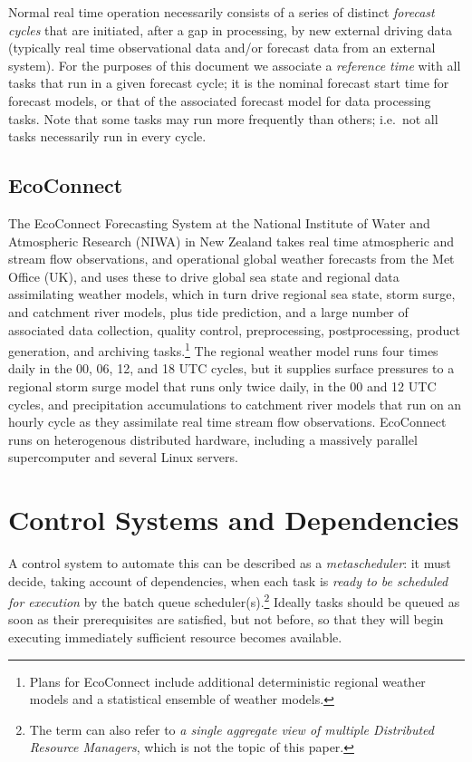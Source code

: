 \documentclass[11pt,a4paper]{article}
\begin{document}
Normal real time operation necessarily consists of a series of distinct
{\em forecast cycles} that are initiated, after a gap in processing, by
new external driving data (typically real time observational data and/or
forecast data from an external system). For the purposes of this
document we associate a {\em reference time} with all tasks that run in
a given forecast cycle; it is the nominal forecast start time for
forecast models, or that of the associated forecast model for data
processing tasks. Note that some tasks may run more frequently than
others; i.e.\ not all tasks necessarily run in every cycle. 


\subsection{EcoConnect}

The EcoConnect Forecasting System at the National Institute of Water and
Atmospheric Research (NIWA) in New Zealand takes real time atmospheric
and stream flow observations, and operational global weather forecasts
from the Met Office (UK), and uses these to drive global sea state and
regional data assimilating weather models, which in turn drive regional
sea state, storm surge, and catchment river models, plus tide
prediction, and a large number of associated data collection, quality
control, preprocessing, postprocessing, product generation, and
archiving tasks.\footnote{Plans for EcoConnect include additional
deterministic regional weather models and a statistical ensemble of
weather models.}  The regional weather model runs four times daily in
the 00, 06, 12, and 18 UTC cycles, but it supplies surface pressures to
a regional storm surge model that runs only twice daily, in the 00 and
12 UTC cycles, and precipitation accumulations to catchment river models
that run on an hourly cycle as they assimilate real time stream flow
observations. EcoConnect runs on heterogenous distributed hardware,
including a massively parallel supercomputer and several Linux servers. 


\section{Control Systems and Dependencies}

A control system to automate this can be described as a {\em
metascheduler}: it must decide, taking account of dependencies, when
each task is {\em ready to be scheduled for execution} by the batch
queue scheduler(s).\footnote{The term can also refer to {\it a single
aggregate view of multiple Distributed Resource Managers}, which is not
the topic of this paper.}  Ideally tasks should be queued as soon as
their prerequisites are satisfied, but not before, so that they will
begin executing immediately sufficient resource becomes available. 
\end{document}
